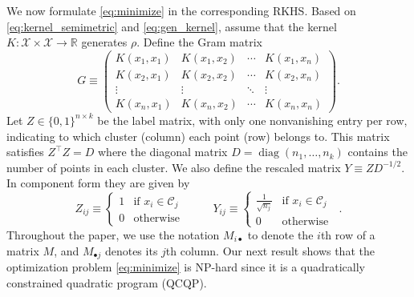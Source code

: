 \documentclass[aps,preprint,nofootinbib,floatfix]{revtex4-1}
\DeclareMathOperator{\diag}{diag}
\newcommand\kk{K}
\newcommand\C{{\mathcal{C}}}
\newcommand\Zt{Y}
\begin{document}
We now formulate \eqref{eq:minimize} in the corresponding
RKHS. Based on \eqref{eq:kernel_semimetric} and \eqref{eq:gen_kernel}, 
assume that the kernel $\kk: \mathcal{X} \times \mathcal{X} \to \mathbb{R}$ 
generates $\rho$.  Define  the Gram matrix
\begin{equation}
\label{eq:kernel_matrix}
G \equiv \begin{pmatrix}
\kk(x_1,x_1) & \kk(x_1,x_2) & \dotsm & \kk(x_1,x_n) \\
\kk(x_2,x_1) & \kk(x_2,x_2) & \dotsm & \kk(x_2,x_n) \\
\vdots & \vdots & \ddots  & \vdots \\
\kk(x_n,x_1) & \kk(x_n,x_2) & \dotsm & \kk(x_n,x_n) 
\end{pmatrix} .
\end{equation}
Let $Z \in \{ 0,1 \}^{n\times k}$ be the label matrix, 
with only one nonvanishing entry per row, 
indicating to which cluster (column)
each point (row) belongs to. This matrix satisfies
$Z^\top Z = D$ where the diagonal matrix 
$D = \diag( n_1,\dotsc, n_k )$  contains
the number of points in each cluster. We also define the rescaled
matrix  $Y \equiv Z D^{-1/2}$. In component form they are given by
\begin{equation}
\label{eq:label_matrix}
Z_{ij} \equiv \begin{cases}
1 & \mbox{if $x_i \in \C_j$ } \\
0 & \mbox{otherwise}
\end{cases} \qquad
\Zt_{ij} \equiv \begin{cases}
\tfrac{1}{\sqrt{n_j}} & \mbox{if $x_i \in \C_j$ } \\
0 & \mbox{otherwise}
\end{cases} .
\end{equation}
Throughout the paper, we use the notation $M_{i\bullet}$ to denote
the $i$th row of a matrix $M$, and $M_{\bullet j}$ denotes its $j$th column.
Our next result shows that the optimization problem \eqref{eq:minimize}
is NP-hard since
it is a quadratically constrained quadratic program (QCQP).
\end{document}

